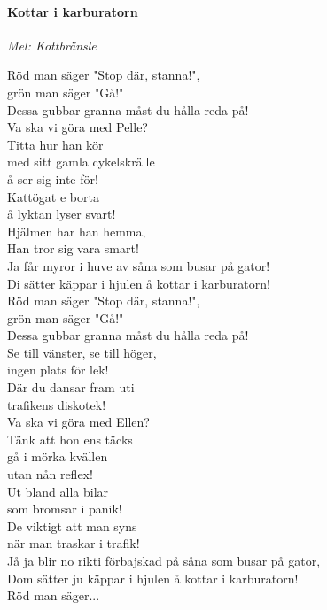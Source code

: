 ﻿
\begin{minipage}{0.45\textwidth}
	\paragraph*{Kottar i karburatorn\\}
	\vspace{3px}
	\textit{Mel: Kottbränsle}\\
\end{minipage}


\noindent
\begin{minipage}{0.45\textwidth}
	\noindent
	Röd man säger "Stop där, stanna!",\\
	grön man säger "Gå!"\\
	Dessa gubbar granna måst du hålla reda på!\\
	
	\noindent
	Va ska vi göra med Pelle?\\
	Titta hur han kör\\
	med sitt gamla cykelskrälle\\
	å ser sig inte för!\\
	Kattögat e borta\\
	å lyktan lyser svart!\\
	Hjälmen har han hemma,\\
	Han tror sig vara smart!\\
	
	\noindent
	Ja får myror i huve av såna som busar på gator!\\
	Di sätter käppar i hjulen å kottar i karburatorn!\\


	\noindent
	Röd man säger "Stop där, stanna!",\\
	grön man säger "Gå!"\\
	Dessa gubbar granna måst du hålla reda på!\\
	Se till vänster, se till höger,\\
	ingen plats för lek!\\
	Där du dansar fram uti\\
	trafikens diskotek!\\
	
	
	\noindent
	Va ska vi göra med Ellen?\\
	Tänk att hon ens täcks\\
	gå i mörka kvällen\\
	utan nån reflex!\\
	Ut bland alla bilar\\
	som bromsar i panik!\\
	De viktigt att man syns\\
	när man traskar i trafik!\\


	\noindent
	Jå ja blir no rikti förbajskad på såna som busar på gator,\\
	Dom sätter ju käppar i hjulen å kottar i karburatorn!\\
	
	Röd man säger...\\
\end{minipage}%
